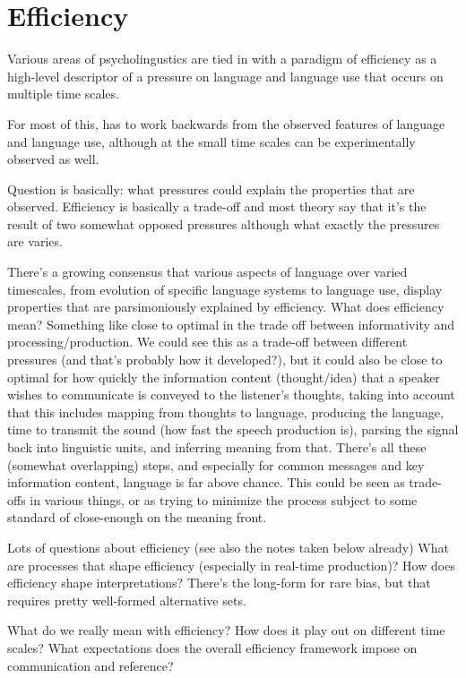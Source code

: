 \documentclass[]{article}
\begin{document}
\section{Efficiency}

Various areas of psycholingustics are tied in with a paradigm of efficiency as a high-level descriptor of a pressure on language and language use that occurs on multiple time scales. 

For most of this, has to work backwards from the observed features of language and language use, although at the small time scales can be experimentally observed as well. 

Question is basically: what pressures could explain the properties that are observed. Efficiency is basically a trade-off and most theory say that it's the result of two somewhat opposed pressures although what exactly the pressures are varies. 


There's a growing consensus that various aspects of language over varied timescales, from evolution of specific language systems to language use, display properties that are parsimoniously explained by efficiency. What does efficiency mean? Something like close to optimal in the trade off between informativity and processing/production. We could see this as a trade-off between different pressures (and that's probably how it developed?), but it could also be close to optimal for how quickly the information content (thought/idea) that a speaker wishes to communicate is conveyed to the listener's thoughts, taking into account that this includes mapping from thoughts to language, producing the language, time to transmit the sound (how fast the speech production is), parsing the signal back into linguistic units, and inferring meaning from that. There's all these (somewhat overlapping) steps, and especially for common messages and key information content, language is far above chance. This could be seen as trade-offs in various things, or as trying to minimize the process subject to some standard of close-enough on the meaning front. 


Lots of questions about efficiency (see also the notes taken below already)
What are processes that shape efficiency (especially in real-time production)? How does efficiency shape interpretations? There's the long-form for rare bias, but that requires pretty well-formed alternative sets. 

What do we really mean with efficiency? How does it play out on different time scales? What expectations does the overall efficiency framework impose on communication and reference? 
\end{document}
